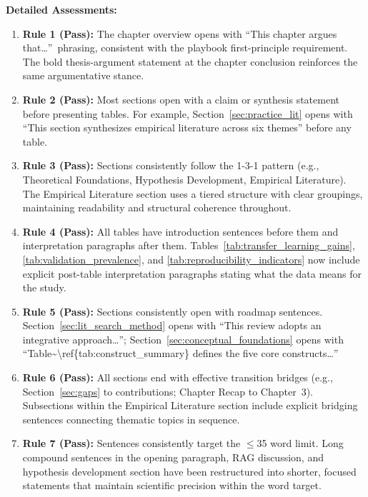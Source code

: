 \noindent\textbf{Detailed Assessments:}

\begin{enumerate}[nosep, leftmargin=*]
\item \textbf{Rule 1 (Pass):} The chapter overview opens with ``This chapter argues that\ldots''\ phrasing, consistent with the playbook first-principle requirement. The bold thesis-argument statement at the chapter conclusion reinforces the same argumentative stance.

\item \textbf{Rule 2 (Pass):} Most sections open with a claim or synthesis statement before presenting tables. For example, Section~\ref{sec:practice_lit} opens with ``This section synthesizes empirical literature across six themes'' before any table.

\item \textbf{Rule 3 (Pass):} Sections consistently follow the 1-3-1 pattern (e.g., Theoretical Foundations, Hypothesis Development, Empirical Literature). The Empirical Literature section uses a tiered structure with clear groupings, maintaining readability and structural coherence throughout.

\item \textbf{Rule 4 (Pass):} All tables have introduction sentences before them and interpretation paragraphs after them. Tables~\ref{tab:transfer_learning_gains}, \ref{tab:validation_prevalence}, and \ref{tab:reproducibility_indicators} now include explicit post-table interpretation paragraphs stating what the data means for the study.

\item \textbf{Rule 5 (Pass):} Sections consistently open with roadmap sentences. Section~\ref{sec:lit_search_method} opens with ``This review adopts an integrative approach\ldots''; Section~\ref{sec:conceptual_foundations} opens with ``Table\textasciitilde\textbackslash ref\{tab:construct\_summary\} defines the five core constructs\ldots''

\item \textbf{Rule 6 (Pass):} All sections end with effective transition bridges (e.g., Section~\ref{sec:gaps} to contributions; Chapter Recap to Chapter~3). Subsections within the Empirical Literature section include explicit bridging sentences connecting thematic topics in sequence.

\item \textbf{Rule 7 (Pass):} Sentences consistently target the $\leq$35 word limit. Long compound sentences in the opening paragraph, RAG discussion, and hypothesis development section have been restructured into shorter, focused statements that maintain scientific precision within the word target.


\end{enumerate}
